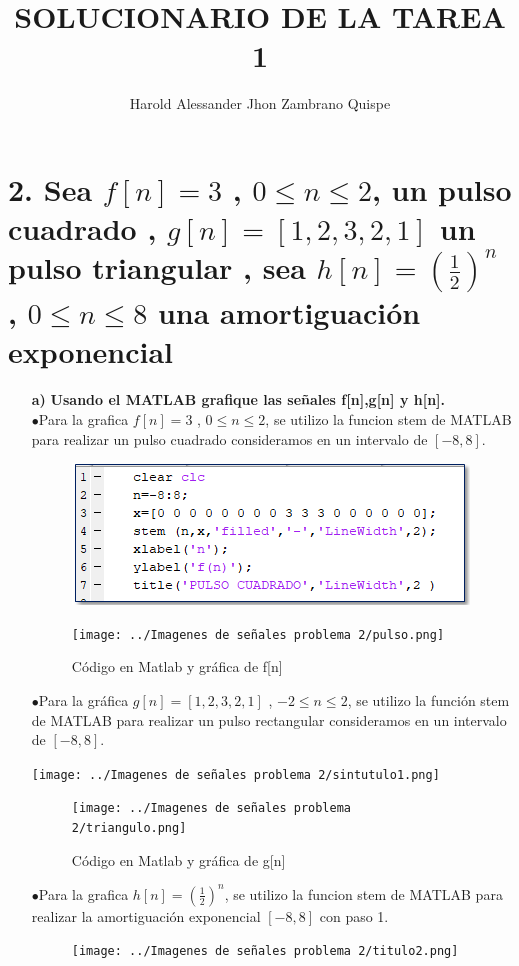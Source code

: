 \documentclass[11pt,a4paper]{article}
\author{Harold Alessander Jhon Zambrano Quispe}
\title{SOLUCIONARIO DE LA TAREA 1}
\begin{document}
   
	\section{{\large \textbf{2. Sea $f[n]=3$ , $0\leq n \leq 2$, un pulso cuadrado , $g[n]=[1,2,3,2,1]$ un pulso triangular , sea $h[n]=(\frac{1}{2})^n$ , $0\leq n\leq 8$ una amortiguación exponencial}}}{
	\large{
	\begin{enumerate}
	\item[\textbf{a)}]
	\textbf{Usando el MATLAB grafique las señales f[n],g[n] y h[n].}\\
	$ \bullet$Para la grafica $f[n]=3$ , $ 0\leq n\leq 2$, se utilizo la funcion stem de MATLAB para realizar un pulso cuadrado consideramos en un intervalo de $[-8,8]$.
\begin{figure}[h]
\centering
\includegraphics[scale=0.6]{../Imagenes de señales problema 2/Sin título.png} 
\end{figure}

\begin{figure}[h]
\centering
\texttt{[image: ../Imagenes de señales problema 2/pulso.png]} 
\caption{Código en Matlab y gráfica de f[n]} 
\label{Gráfica_fn}
\end{figure}
$\bullet$Para la gráfica $g[n]=[1,2,3,2,1]$ , $-2\leq n\leq 2$, se utilizo la función stem de MATLAB para realizar un pulso rectangular consideramos en un intervalo de $[-8,8]$.

\begin{center}
\texttt{[image: ../Imagenes de señales problema 2/sintutulo1.png]}
\end{center}

\begin{figure}[h]
\centering
\texttt{[image: ../Imagenes de señales problema 2/triangulo.png]} 
\caption{Código en Matlab y gráfica de g[n]} 
\label{Gráfica_gn}
\end{figure}
\newpage
$\bullet$Para la grafica $h[n]=(\frac{1}{2})^n$, se utilizo la funcion stem de MATLAB para realizar la amortiguación exponencial $[-8,8]$ con paso 1.
\begin{figure}[h]
\centering
\texttt{[image: ../Imagenes de señales problema 2/titulo2.png]} 
\label{Código_hn}
\end{figure}


\end{enumerate}}}
\end{document}
